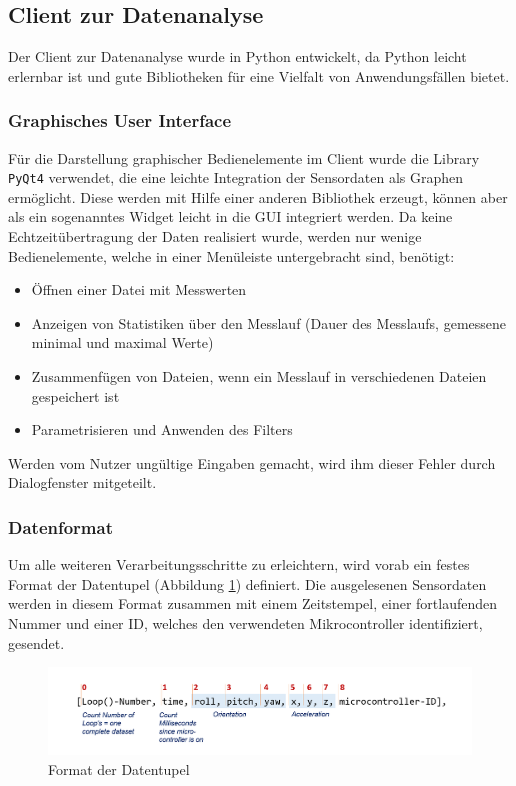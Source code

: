 \subsection{Client zur Datenanalyse}

Der Client zur Datenanalyse wurde in Python entwickelt, da Python leicht erlernbar ist und gute Bibliotheken für eine Vielfalt von Anwendungsfällen bietet.
\subsubsection{Graphisches User Interface}
Für die Darstellung graphischer Bedienelemente im Client wurde die Library \texttt{PyQt4} verwendet, die eine leichte Integration der Sensordaten als Graphen ermöglicht. Diese werden mit Hilfe einer anderen Bibliothek erzeugt, können aber als ein sogenanntes Widget leicht in die GUI integriert werden.
Da keine Echtzeitübertragung der Daten realisiert wurde, werden nur wenige Bedienelemente, welche in einer Menüleiste untergebracht sind, benötigt:
\begin{itemize}
\item Öffnen einer Datei mit Messwerten
\item Anzeigen von Statistiken über den Messlauf (Dauer des Messlaufs, gemessene minimal und maximal Werte)
\item Zusammenfügen von Dateien, wenn ein Messlauf in verschiedenen Dateien gespeichert ist
\item Parametrisieren und Anwenden des Filters
\end{itemize}
Werden vom Nutzer ungültige Eingaben gemacht, wird ihm dieser Fehler durch Dialogfenster mitgeteilt. 
\subsubsection{Datenformat}
Um alle weiteren Verarbeitungsschritte zu erleichtern, wird vorab ein festes Format der Datentupel (Abbildung \ref{fig:k3-datenformat.png}) definiert. Die ausgelesenen Sensordaten werden in diesem Format zusammen mit einem Zeitstempel, einer fortlaufenden Nummer und einer ID, welches den verwendeten Mikrocontroller identifiziert, gesendet.
\begin{figure}[h]
	\centering
	\includegraphics[width=1\textwidth]{images/k3-datenformat.png}
	\caption {Format der Datentupel}
	\label{fig:k3-datenformat.png} 
\end{figure}
